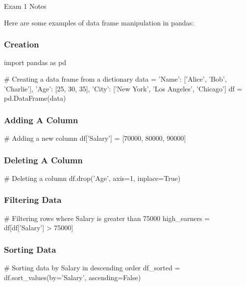 \begin{examnotes}{Exam 1 Notes}
    \begin{highlight}
        Here are some examples of data frame manipulation in pandas:

        \subsubsection*{Creation}

    \begin{code}[Python]
    import pandas as pd

    # Creating a data frame from a dictionary
    data = {'Name': ['Alice', 'Bob', 'Charlie'], 
            'Age': [25, 30, 35],
            'City': ['New York', 'Los Angeles', 'Chicago']}
    df = pd.DataFrame(data)            
    \end{code}

        \subsubsection*{Adding A Column}

    \begin{code}[Python]
    # Adding a new column
    df['Salary'] = [70000, 80000, 90000]        
    \end{code}

        \subsubsection*{Deleting A Column}

    \begin{code}[Python]
    # Deleting a column
    df.drop('Age', axis=1, inplace=True)        
    \end{code}

        \subsubsection*{Filtering Data}

    \begin{code}[Python]
    # Filtering rows where Salary is greater than 75000
    high_earners = df[df['Salary'] > 75000]        
    \end{code}

        \subsubsection*{Sorting Data}

    \begin{code}[Python]
    # Sorting data by Salary in descending order
    df_sorted = df.sort_values(by='Salary', ascending=False)        
    \end{code}


\end{highlight}
\end{examnotes}

